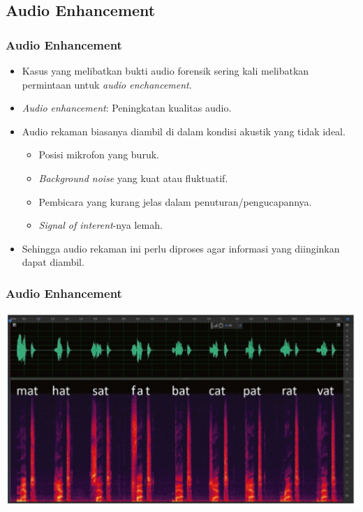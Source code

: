 \documentclass[pdflatex,compress]{beamer}
\begin{document}
\subsection{Audio Enhancement}

\begin{frame}
	\frametitle{Audio Enhancement}
	\begin{itemize}
		\item Kasus yang melibatkan bukti audio forensik sering kali melibatkan permintaan untuk \textit{audio enchancement}.
		\item \textit{Audio enhancement}: Peningkatan kualitas audio.
		\item Audio rekaman biasanya diambil di dalam kondisi akustik yang tidak ideal.
		\begin{itemize}
			\item Posisi mikrofon yang buruk.
			\item \textit{Background noise} yang kuat atau fluktuatif.
			\item Pembicara yang kurang jelas dalam penuturan/pengucapannya.
			\item \textit{Signal of interent}-nya lemah.
		\end{itemize}
		\item Sehingga audio rekaman ini perlu diproses agar informasi yang diinginkan dapat diambil.
	\end{itemize}
\end{frame}

\begin{frame}
	\frametitle{Audio Enhancement}
	
	\begin{center}
		\includegraphics[width=0.8\linewidth]{img/img004}
	\end{center}
	
\end{frame}
\end{document}
